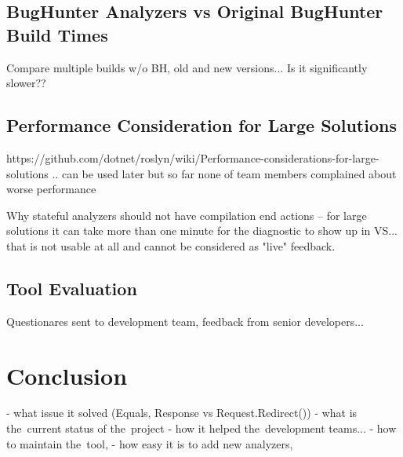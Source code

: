 \documentclass[
  digital, %
  table,   %
  lof,     %
  lot,     %
  oneside,
]{fithesis3}
\begin{document}
\section{BugHunter Analyzers vs Original BugHunter Build Times}
Compare multiple builds w/o BH, old and new versions... Is it significantly slower??

\section{Performance Consideration for Large Solutions}
https://github.com/dotnet/roslyn/wiki/Performance-considerations-for-large-solutions
.. can be used later but so far none of team members complained about worse performance

Why stateful analyzers should not have compilation end actions -- for large solutions it can take more than one minute for the diagnostic to show up in VS... that is not usable at all and cannot be considered as "live" feedback.

\section{Tool Evaluation}
Questionares sent to development team, feedback from senior developers...

\chapter{Conclusion}
  - what issue it solved (Equals, Response vs Request.Redirect())
  - what is the~current status of the~project
  - how it helped the~development teams...
  - how to maintain the~tool, 
  - how easy it is to add new analyzers, 
\end{document}
